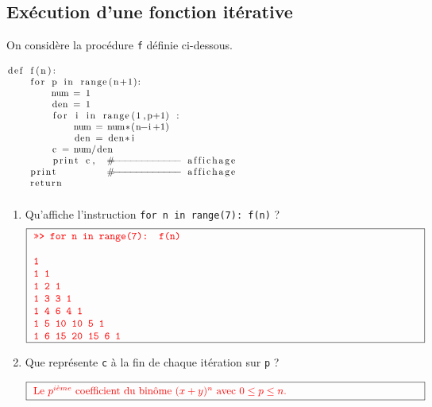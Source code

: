 \subsection*{Exécution d'une fonction itérative}
On considère la procédure {\tt f} définie ci-dessous.
$$\begin{minipage}[t]{15cm}
\begin{lstlisting}
def f(n):
    for p in range(n+1):
        num = 1
        den = 1
        for i in range(1,p+1) :
            num = num*(n-i+1)
            den = den*i
        c = num/den
        print c,  #------------ affichage
    print         #------------ affichage
    return
\end{lstlisting}
\end{minipage}$$
\begin{enumerate}
\item Qu'affiche l'instruction {\tt for n in range(7): f(n)} ?
	$$\framebox[13.5cm]{\begin{minipage}{13cm}\color{red}\tt
	>>> for n in range(7): f(n)\\
	\mbox{}\\
	1\\
	1 1\\
	1 2 1\\
	1 3 3 1\\
	1 4 6 4 1\\
	1 5 10 10 5 1\\
	1 6 15 20 15 6 1
	\end{minipage}}$$
\item Que représente {\tt c} à la fin de chaque itération sur {\tt p} ?

	$$\framebox[13.5cm]{\begin{minipage}{13cm}\color{red}
	Le $p^{i\grave eme}$ coefficient du binôme $(x+y)^n$ avec $0 \leq p \leq n$.
	\end{minipage}}$$
\end{enumerate}
